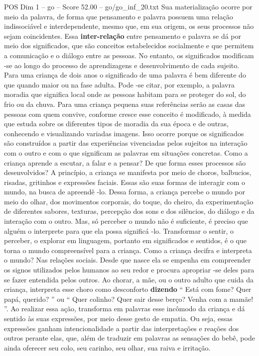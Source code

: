 \begin{textsample}{POS Dim 1 – go – Score 52.00 – go/go\_inf\_20.txt}
Sua materialização ocorre por meio da palavra, de forma que pensamento e palavra possuem uma relação indissociável e interdependente, mesmo que, em sua origem, os seus processos não sejam coincidentes.
Essa \textbf{inter-relação} entre pensamento e palavra se dá por meio dos significados, que são conceitos estabelecidos socialmente e que permitem a comunicação e o diálogo entre as pessoas.
No entanto, os significados modificam -se ao longo do processo de aprendizagens e desenvolvimento de cada sujeito.
Para uma criança de dois anos o significado de uma palavra é bem diferente do que quando maior ou na fase adulta.
Pode -se citar, por exemplo, a palavra moradia que significa local onde as pessoas habitam para se proteger do sol, do frio ou da chuva.
Para uma criança pequena suas referências serão as casas das pessoas com quem convive, conforme cresce esse conceito é modificado, à medida que estuda sobre os diferentes tipos de moradia da sua época e de outras, conhecendo e visualizando variadas imagens.
Isso ocorre porque os significados são construídos a partir das experiências vivenciadas pelos sujeitos na interação com o outro e com o que significam as palavras em situações concretas.
Como a criança aprende a escutar, a falar e a pensar?
De que forma esses processos são desenvolvidos?
A princípio, a criança se manifesta por meio de choros, balbucios, risadas, gritinhos e expressões faciais.
Essas são suas formas de interagir com o mundo, na busca de apreendê -lo.
Dessa forma, a criança percebe o mundo por meio do olhar, dos movimentos corporais, do toque, do cheiro, da experimentação de diferentes sabores, texturas, percepção dos sons e dos silêncios, do diálogo e da interação com o outro.
Mas, só perceber o mundo não é suficiente, é preciso que alguém o interprete para que ela possa significá -lo.
Transformar o sentir, o perceber, o explorar em linguagem, portanto em significados e sentidos, é o que torna o mundo compreensível para a criança.
Como a criança decifra e interpreta o mundo?
Nas relações sociais.
Desde que nasce ela se empenha em compreender os signos utilizados pelos humanos ao seu redor e procura apropriar -se deles para se fazer entendida pelos outros.
Ao chorar, a mãe, ou o outro adulto que cuida da criança, interpreta esse choro como desconforto \textbf{dizendo} “ Está com fome?
Quer papá, querido? ” ou “ Quer colinho?
Quer sair desse berço?
Venha com a mamãe! ”.
Ao realizar essa ação, transforma em palavras esse incômodo da criança e dá sentido às suas expressões, por meio desse gesto de empatia.
Ou seja, essas expressões ganham intencionalidade a partir das interpretações e reações dos outros perante elas, que, além de traduzir em palavras as sensações do bebê, pode ainda oferecer seu colo, seu carinho, seu olhar, sua raiva e irritação.

\end{textsample}
